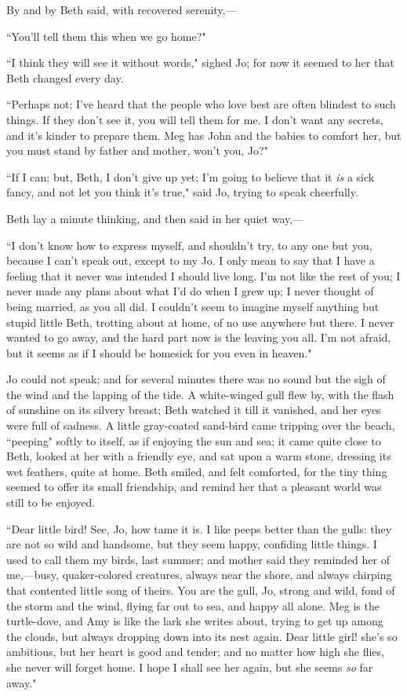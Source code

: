 By and by Beth said, with recovered serenity,---

``You'll tell them this when we go home?"

``I think they will see it without words," sighed Jo; for now it seemed
to her that Beth changed every day.

``Perhaps not; I've heard that the people who love best
are often blindest to such things. If they don't see it,
you will tell them for me. I don't want any secrets, and
it's kinder to prepare them. Meg has John and the babies
to comfort her, but you must stand by father and mother,
won't you, Jo?"

``If I can; but, Beth, I don't give up yet;
I'm going to believe that it \emph{is} a sick fancy, and
not let you think it's true," said Jo, trying to speak
cheerfully.

Beth lay a minute thinking, and then said in her quiet way,---

``I don't know how to express myself, and
shouldn't try, to any one but you, because I
can't speak out, except to my Jo. I only mean to say
that I have a feeling that it never was intended I should live long.
I'm not like the rest of you; I never made any plans
about what I'd do when I grew up; I never thought of
being married, as you all did. I couldn't seem to
imagine myself anything but stupid little Beth, trotting about at home,
of no use anywhere but there. I never wanted to go away, and the hard
part now is the leaving you all. I'm not afraid, but it
seems as if I should be homesick for you even in heaven."

Jo could not speak; and for several minutes there was no sound but the
sigh of the wind and the lapping of the tide. A white-winged gull flew
by, with the flash of sunshine on its silvery breast; Beth watched it
till it vanished, and her eyes were full of sadness. A little
gray-coated sand-bird came tripping over the beach, ``peeping" softly to
itself, as if enjoying the sun and sea; it came quite close to Beth,
looked at her with a friendly eye, and sat upon a warm stone, dressing
its wet feathers, quite at home. Beth smiled, and felt comforted, for
the tiny thing seemed to offer its small friendship, and remind her that
a pleasant world was still to be enjoyed.

``Dear little bird! See, Jo, how tame it is. I like peeps better than the
gulls: they are not so wild and handsome, but they seem happy, confiding
little things. I used to call them my birds, last summer; and mother
said they reminded her of me,---busy, quaker-colored creatures, always
near the shore, and always chirping that contented little song of
theirs. You are the gull, Jo, strong and wild, fond of the storm and the
wind, flying far out to sea, and happy all alone. Meg is the
turtle-dove, and Amy is like the lark she writes about, trying to get up
among the clouds, but always dropping down into its nest again. Dear
little girl! she's so ambitious, but her heart is good
and tender; and no matter how high she flies, she never will forget
home. I hope I shall see her again, but she seems \emph{so} far away."

